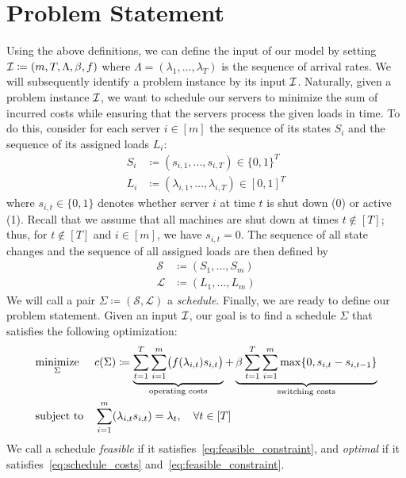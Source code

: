 \section{Problem Statement}
Using the above definitions, we can define the input of our model by setting $\mathcal{I}\coloneqq(m,T,\Lambda,\beta,f)$ where $\Lambda=(\lambda_1,\dotsc,\lambda_T)$ is the sequence of arrival rates. We will subsequently identify a problem instance by its input $\mathcal{I}$. Naturally, given a problem instance $\mathcal{I}$, we want to schedule our servers to minimize the sum of incurred costs while ensuring that the servers process the given loads in time. To do this, consider for each server $i\in[m]$ the sequence of its states $S_i$ and the sequence of its assigned loads $L_i$:
\begin{align*}
	S_i&\coloneqq(s_{i,1},\dotsc,s_{i,T})\in\{0,1\}^T\\
	L_i&\coloneqq(\lambda_{i,1},\dotsc,\lambda_{i,T})\in[0,1]^T
\end{align*}
where $s_{i,t}\in\{0,1\}$ denotes whether server $i$ at time $t$ is shut down (0) or active (1). Recall that we assume that all machines are shut down at times $t\notin[T]$; thus, for $t\notin[T]$ and $i\in[m]$, we have $s_{i,t}=0$. The sequence of all state changes and the sequence of all assigned loads are then defined by
\begin{align*}
	\mathcal{S}&\coloneqq(S_1,\dotsc,S_m)\\
	\mathcal{L}&\coloneqq(L_1,\dotsc,L_m)
\end{align*}
We will call a pair $\Sigma\coloneqq(\mathcal{S},\mathcal{L})$ a \emph{schedule}. Finally, we are ready to define our problem statement. Given an input $\mathcal{I}$, our goal is to find a schedule $\Sigma$ that satisfies the following optimization:
\begin{align}
	&\underset{\Sigma}{\text{minimize}}&&c(\Sigma)\coloneqq\underbrace{\sum\limits_{t=1}^{T}\sum\limits_{i=1}^{m}\bigl(f(\lambda_{i,t}) s_{i,t}\bigr)}_{\text{operating costs}}+\underbrace{\beta\sum\limits_{t=1}^{T}\sum\limits_{i=1}^{m}\max\{0,s_{i,t}-s_{i,t-1}\}}_{\text{switching costs}}\label{eq:schedule_costs}\\ 
	&\text{subject to}&&\sum\limits_{i=1}^{m}(\lambda_{i,t} s_{i,t})=\lambda_t,\quad \forall t\in[T]\label{eq:feasible_constraint}
\end{align}
We call a schedule \emph{feasible} if it satisfies~\eqref{eq:feasible_constraint}, and \emph{optimal} if it satisfies~\eqref{eq:schedule_costs} and~\eqref{eq:feasible_constraint}.
